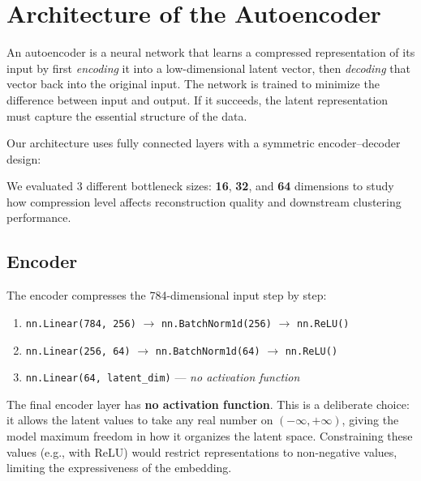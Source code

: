 \documentclass[12pt,a4paper]{article}
\begin{document}
\section{Architecture of the Autoencoder}

An autoencoder is a neural network that learns a compressed representation of its input by first \textit{encoding} it into a low-dimensional latent vector, then \textit{decoding} that vector back into the original input. The network is trained to minimize the difference between input and output. If it succeeds, the latent representation must capture the essential structure of the data.

Our architecture uses fully connected layers with a symmetric encoder--decoder design:

\begin{tcolorbox}[colback=lightblue, colframe=accentblue, title={\color{white}\textbf{Latent Space Configurations}}, fonttitle=\bfseries, coltitle=white]
We evaluated 3 different bottleneck sizes: \textcolor{deepblue}{\textbf{16}}, \textcolor{deepblue}{\textbf{32}}, and \textcolor{deepblue}{\textbf{64}} dimensions to study how compression level affects reconstruction quality and downstream clustering performance.
\end{tcolorbox}

\subsection{Encoder}
The encoder compresses the 784-dimensional input step by step:
\begin{enumerate}
    \item \texttt{nn.Linear(784, 256)} $\rightarrow$ \texttt{nn.BatchNorm1d(256)} $\rightarrow$ \texttt{\textcolor{accentorange}{nn.ReLU()}}
    \item \texttt{nn.Linear(256, 64)} $\rightarrow$ \texttt{nn.BatchNorm1d(64)} $\rightarrow$ \texttt{\textcolor{accentorange}{nn.ReLU()}}
    \item \texttt{nn.Linear(64, latent\_dim)} — \textit{no activation function}
\end{enumerate}

The final encoder layer has \textbf{no activation function}. This is a deliberate choice: it allows the latent values to take any real number on $(-\infty, +\infty)$, giving the model maximum freedom in how it organizes the latent space. Constraining these values (e.g., with ReLU) would restrict representations to non-negative values, limiting the expressiveness of the embedding.
\end{document}
